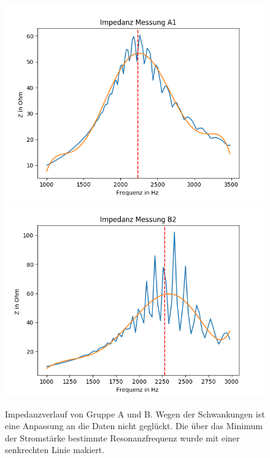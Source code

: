 \documentclass[12pt,a4paper]{article}
\begin{document}
\begin{figure}
\centering
\includegraphics[scale=1]{Bilder/Parallel_Impedanz.png}
\includegraphics[scale=1]{Bilder/Parallel_ImpedanzB.png}
\caption{Impedanzverlauf von Gruppe A und B. Wegen der Schwankungen ist eine Anpassung an die Daten nicht geglückt. Die über das Minimum der Stromstärke bestimmte Resonanzfrequenz wurde mit einer senkrechten Linie makiert.}
\label{fig:parallel_Impedanz}
\end{figure}
\end{document}

